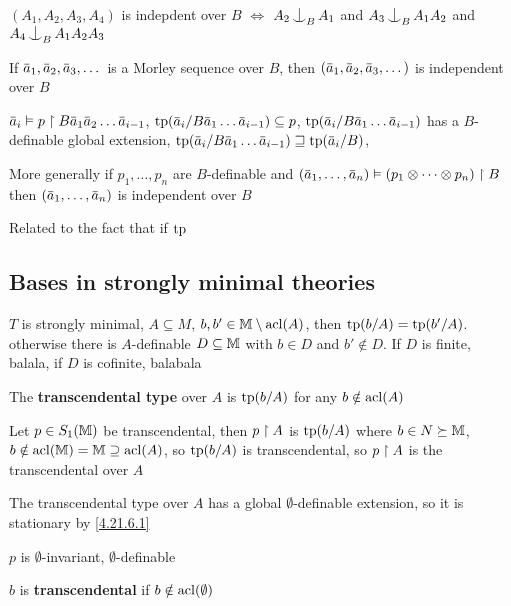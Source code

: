 \documentclass[11pt]{article}
\begin{document}
\begin{examplle}[]
\((A_1,A_2,A_3,A_4)\) is indepdent over \(B\) \(\Leftrightarrow\) \(A_2\ind_BA_1\) and \(A_3\ind_BA_1A_2\) and \(A_4\ind_B{A_1A_2A_3}\)
\end{examplle}

\begin{examplle}[]
If \(\bara_1,\bara_2,\bara_3,\dots\) is a Morley sequence over \(B\), then \((\bara_1,\bara_2,\bara_3,\dots)\)
is independent over \(B\)

\(\bara_i\vDash p\uhr B\bara_1\bara_2\dots\bara_{i-1}\),
\(\tp(\bara_i/B\bara_1\dots\bara_{i-1})\subseteq p\), \(\tp(\bara_i/B\bara_1\dots\bara_{i-1})\) has
a \(B\)-definable global extension, \(\tp(\bara_i/B\bara_1\dots\bara_{i-1})\sqsupseteq\tp(\bara_i/B)\),

More generally if \(p_1,\dots,p_n\) are \(B\)-definable and \((\bara_1,\dots,\bara_n)\vDash(p_1\otimes\dots\otimes p_n)\uhr B\)
then \((\bara_1,\dots,\bara_n)\) is independent over \(B\)

Related to the fact that if \(\operatorname{tp}\)
\end{examplle}
\subsection{Bases in strongly minimal theories}
\label{sec:org2550238}
\(T\) is strongly minimal, \(A\subseteq M\), \(b,b'\in\mathbb{M}\setminus\operatorname{acl}(A)\), then \(\operatorname{tp}(b/A)=\operatorname{tp}(b'/A)\). otherwise
there is \(A\)-definable \(D\subseteq\mathbb{M}\) with \(b\in D\) and \(b'\notin D\). If \(D\) is finite, balala,
if \(D\) is cofinite, balabala

\begin{definition}[]
The \textbf{transcendental type} over \(A\) is \(\operatorname{tp}(b/A)\) for any \(b\notin\operatorname{acl}(A)\)
\end{definition}

Let \(p\in S_1(\mathbb{M})\) be transcendental, then \(p\upharpoonright A\) is \(\operatorname{tp}(b/A)\)
where \(b\in N\succeq\mathbb{M}\), \(b\notin\operatorname{acl}(\mathbb{M})=\mathbb{M}\supseteq\operatorname{acl}(A)\), so \(\operatorname{tp}(b/A)\) is transcendental, so \(p\upharpoonright A\) is
the transcendental over \(A\)

The transcendental type over \(A\) has a global \(\emptyset\)-definable extension, so it is stationary by \ref{4.21.6.1}

\(p\) is \(\emptyset\)-invariant, \(\emptyset\)-definable

\begin{definition}[]
\(b\) is \textbf{transcendental} if \(b\notin\operatorname{acl}(\emptyset)\)
\end{definition}
\end{document}
